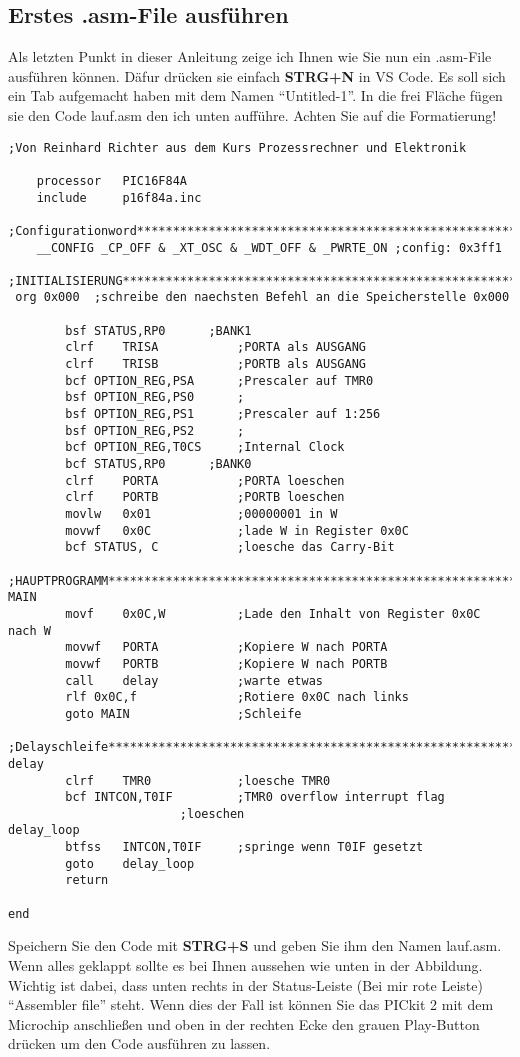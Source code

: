 \subsection{Erstes .asm-File ausführen}
Als letzten Punkt in dieser Anleitung zeige ich Ihnen wie Sie nun ein {\ttfamily .asm}-File ausführen können. Däfur drücken sie einfach \textbf{STRG+N} in VS Code. Es soll sich ein Tab aufgemacht haben mit dem Namen \enquote{Untitled-1}. In die frei Fläche fügen sie den Code {\ttfamily lauf.asm} den ich unten aufführe. Achten Sie auf die Formatierung!
\begin{lstlisting}[language={[x86masm]Assembler}]
;Von Reinhard Richter aus dem Kurs Prozessrechner und Elektronik

    processor	PIC16F84A
    include		p16f84a.inc

;Configurationword*******************************************************
    __CONFIG _CP_OFF & _XT_OSC & _WDT_OFF & _PWRTE_ON ;config: 0x3ff1

;INITIALISIERUNG*********************************************************
 org 0x000	;schreibe den naechsten Befehl an die Speicherstelle 0x000

        bsf	STATUS,RP0		;BANK1
        clrf	TRISA			;PORTA als AUSGANG
        clrf	TRISB			;PORTB als AUSGANG
        bcf	OPTION_REG,PSA		;Prescaler auf TMR0
        bsf	OPTION_REG,PS0		;
        bsf	OPTION_REG,PS1		;Prescaler auf 1:256
        bsf	OPTION_REG,PS2		;
        bcf	OPTION_REG,T0CS		;Internal Clock
        bcf	STATUS,RP0		;BANK0
        clrf	PORTA			;PORTA loeschen
        clrf	PORTB			;PORTB loeschen
        movlw	0x01			;00000001 in W
        movwf	0x0C			;lade W in Register 0x0C
        bcf	STATUS, C			;loesche das Carry-Bit

;HAUPTPROGRAMM***********************************************************
MAIN
        movf	0x0C,W			;Lade den Inhalt von Register 0x0C nach W
        movwf	PORTA			;Kopiere W nach PORTA
        movwf	PORTB			;Kopiere W nach PORTB
        call	delay			;warte etwas
        rlf	0x0C,f				;Rotiere 0x0C nach links
        goto MAIN				;Schleife

;Delayschleife***********************************************************
delay
        clrf	TMR0			;loesche TMR0
        bcf	INTCON,T0IF			;TMR0 overflow interrupt flag
                        ;loeschen
delay_loop
        btfss	INTCON,T0IF		;springe wenn T0IF gesetzt
        goto	delay_loop			
        return

end
\end{lstlisting}
Speichern Sie den Code mit \textbf{STRG+S} und geben Sie ihm den Namen {\ttfamily lauf.asm}. Wenn alles geklappt sollte es bei Ihnen aussehen wie unten in der Abbildung. Wichtig ist dabei, dass unten rechts in der Status-Leiste (Bei mir rote Leiste) \enquote{Assembler file} steht. Wenn dies der Fall ist können Sie das PICkit 2 mit dem Microchip anschließen und oben in der rechten Ecke den grauen Play-Button drücken um den Code ausführen zu lassen. 
